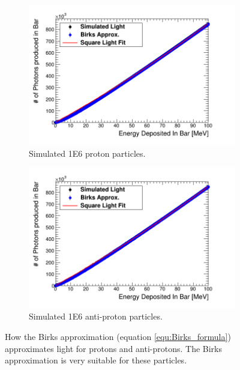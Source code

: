 \begin{figure}[htbp]
\centering
\begin{subfigure}{.5\textwidth}
  \centering
  \includegraphics[width=\linewidth]{Appendix5/newFigs/protonBirksSlab_simAndApproxLight.png}
  \captionsetup{width=.9\linewidth}
  \caption{Simulated 1E6 proton particles.}
  \label{subfig:append5_light_of_protons0-100mev}
\end{subfigure}%
\begin{subfigure}{.5\textwidth}
  \centering
  \includegraphics[width=\linewidth]{Appendix5/newFigs/aProtonBirksSlab_simAndApproxLight.png}
  \captionsetup{width=.9\linewidth}
  \caption{Simulated 1E6 anti-proton particles.}
  \label{subfig:append5_light_of_Aprotons0-100mev}
\end{subfigure}
\caption{How the Birks approximation (equation \ref{equ:Birks_formula}) approximates light for protons and anti-protons. The Birks approximation is very suitable for these particles.}
\label{fig:append5_light_of_protons_Aprotons0-100mev}
\end{figure}

